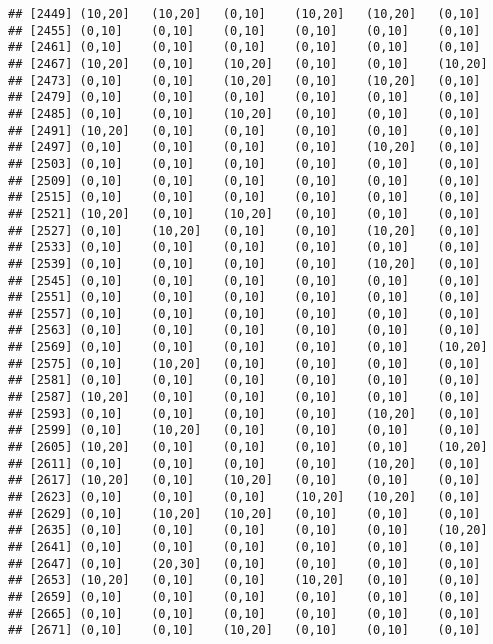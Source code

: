 \documentclass[]{article}
\begin{document}
\begin{verbatim}
## [2449] (10,20]   (10,20]   (0,10]    (10,20]   (10,20]   (0,10]   
## [2455] (0,10]    (0,10]    (0,10]    (0,10]    (0,10]    (0,10]   
## [2461] (0,10]    (0,10]    (0,10]    (0,10]    (0,10]    (0,10]   
## [2467] (10,20]   (0,10]    (10,20]   (0,10]    (0,10]    (10,20]  
## [2473] (0,10]    (0,10]    (10,20]   (0,10]    (10,20]   (0,10]   
## [2479] (0,10]    (0,10]    (0,10]    (0,10]    (0,10]    (0,10]   
## [2485] (0,10]    (0,10]    (10,20]   (0,10]    (0,10]    (0,10]   
## [2491] (10,20]   (0,10]    (0,10]    (0,10]    (0,10]    (0,10]   
## [2497] (0,10]    (0,10]    (0,10]    (0,10]    (10,20]   (0,10]   
## [2503] (0,10]    (0,10]    (0,10]    (0,10]    (0,10]    (0,10]   
## [2509] (0,10]    (0,10]    (0,10]    (0,10]    (0,10]    (0,10]   
## [2515] (0,10]    (0,10]    (0,10]    (0,10]    (0,10]    (0,10]   
## [2521] (10,20]   (0,10]    (10,20]   (0,10]    (0,10]    (0,10]   
## [2527] (0,10]    (10,20]   (0,10]    (0,10]    (10,20]   (0,10]   
## [2533] (0,10]    (0,10]    (0,10]    (0,10]    (0,10]    (0,10]   
## [2539] (0,10]    (0,10]    (0,10]    (0,10]    (10,20]   (0,10]   
## [2545] (0,10]    (0,10]    (0,10]    (0,10]    (0,10]    (0,10]   
## [2551] (0,10]    (0,10]    (0,10]    (0,10]    (0,10]    (0,10]   
## [2557] (0,10]    (0,10]    (0,10]    (0,10]    (0,10]    (0,10]   
## [2563] (0,10]    (0,10]    (0,10]    (0,10]    (0,10]    (0,10]   
## [2569] (0,10]    (0,10]    (0,10]    (0,10]    (0,10]    (10,20]  
## [2575] (0,10]    (10,20]   (0,10]    (0,10]    (0,10]    (0,10]   
## [2581] (0,10]    (0,10]    (0,10]    (0,10]    (0,10]    (0,10]   
## [2587] (10,20]   (0,10]    (0,10]    (0,10]    (0,10]    (0,10]   
## [2593] (0,10]    (0,10]    (0,10]    (0,10]    (10,20]   (0,10]   
## [2599] (0,10]    (10,20]   (0,10]    (0,10]    (0,10]    (0,10]   
## [2605] (10,20]   (0,10]    (0,10]    (0,10]    (0,10]    (10,20]  
## [2611] (0,10]    (0,10]    (0,10]    (0,10]    (10,20]   (0,10]   
## [2617] (10,20]   (0,10]    (10,20]   (0,10]    (0,10]    (0,10]   
## [2623] (0,10]    (0,10]    (0,10]    (10,20]   (10,20]   (0,10]   
## [2629] (0,10]    (10,20]   (10,20]   (0,10]    (0,10]    (0,10]   
## [2635] (0,10]    (0,10]    (0,10]    (0,10]    (0,10]    (10,20]  
## [2641] (0,10]    (0,10]    (0,10]    (0,10]    (0,10]    (0,10]   
## [2647] (0,10]    (20,30]   (0,10]    (0,10]    (0,10]    (0,10]   
## [2653] (10,20]   (0,10]    (0,10]    (10,20]   (0,10]    (0,10]   
## [2659] (0,10]    (0,10]    (0,10]    (0,10]    (0,10]    (0,10]   
## [2665] (0,10]    (0,10]    (0,10]    (0,10]    (0,10]    (0,10]   
## [2671] (0,10]    (0,10]    (10,20]   (0,10]    (0,10]    (0,10]   

\end{verbatim}
\end{document}

